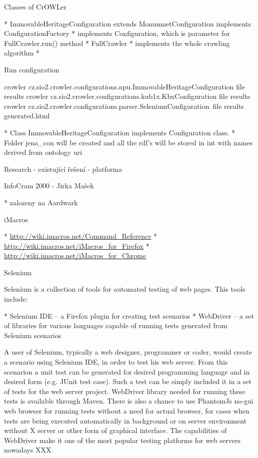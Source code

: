 \secc Classes of CrOWLer

\begitems
  * ImmovableHeritageConfiguration extends MonumnetConfiguration implements ConfigurationFactory 
  \begitems
    * implements Configuration, which is parameter for FullCrawler.run() method
  \enditems
  * FullCrawler
  \begitems
    * implements the whole crawling algorithm
    * 
  \enditems
\enditems

\secc Run configuration 

\begtt
crowler cz.sio2.crowler.configurations.npu.ImmovableHeritageConfiguration file results
crowler cz.sio2.crowler.configurations.kub1x.KbxConfiguration file results
crowler cz.sio2.crowler.configurations.parser.SeleniumConfiguration\
         file results generated.html
\endtt

\begitems
  * Class ImmovableHeritageConfiguration implements Configuration class. 
  * Folder jena\_con will be created and all the rdf's will be stored in int with names derived from ontology uri
\enditems





\sec Research - existující řešení - platforma


\secc InfoCram 2000 - Jirka Mašek



\begitems
  * zalozeny na Aardwark 
\enditems


\secc iMacros

\begitems
  * \url{http://wiki.imacros.net/Command_Reference}
  * \url{http://wiki.imacros.net/iMacros_for_Firefox}
  * \url{http://wiki.imacros.net/iMacros_for_Chrome}
\enditems



%



\secc Selenium

Selenium is a collection of tools for automated testing of web pages. This tools include: 

\begitems
  * Selenium IDE -- a Firefox plugin for creating test scenarios
  * WebDriver -- a set of libraries for various languages capable of running
    tests generated from Selenium scenarios
\enditems

A user of Selenium, typically a web designer, programmer or coder, would create
a scenario using Selenium IDE, in order to test his web server. From this
scenarion a unit test can be generated for desired programming language and in
desired form (e.g. JUnit test case). Such a test can be simply included it in a
set of tests for the web server project. WebDriver library needed for running
these tests is available through Maven. There is also a chance to use PhantomJs
no-gui web browser for running tests without a need for actual browser, for
cases when tests are being executed automatically in background or on server
environment without X server or other form of graphical interface. The
capabilities of WebDriver make it one of the most popular testing platforms for
web servers nowadays XXX. 

